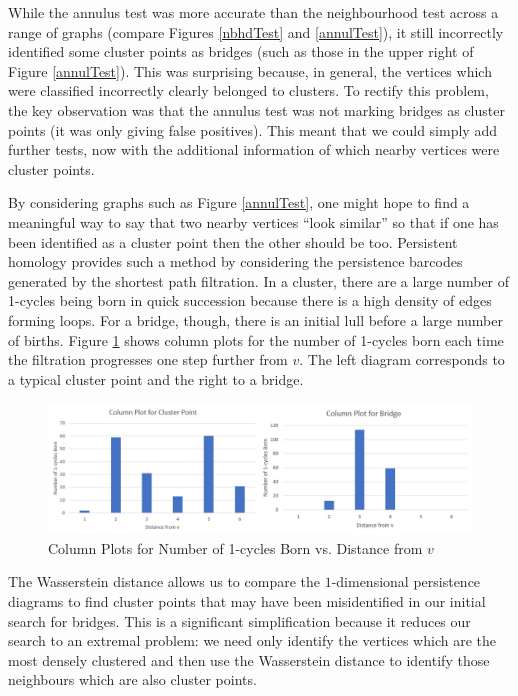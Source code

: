 \documentclass[12pt,a4paper]{amsart}
\numberwithin{equation}{section}
\theoremstyle{plain}
\theoremstyle{definition}
\begin{document}
While the annulus test was more accurate than the neighbourhood test across a range of graphs (compare Figures \ref{nbhdTest} and \ref{annulTest}), it still incorrectly identified some cluster points as bridges (such as those in the upper right of Figure \ref{annulTest}). This was surprising because, in general, the vertices which were classified incorrectly clearly belonged to clusters. To rectify this problem, the key observation was that the annulus test was not marking bridges as cluster points (it was only giving false positives). This meant that we could simply add further tests, now with the additional information of which nearby vertices were cluster points. 

By considering graphs such as Figure \ref{annulTest}, one might hope to find a meaningful way to say that two nearby vertices ``look similar'' so that if one has been identified as a cluster point then the other should be too. Persistent homology provides such a method by considering the persistence barcodes generated by the shortest path filtration. In a cluster, there are a large number of 1-cycles being born in quick succession because there is a high density of edges forming loops. For a bridge, though, there is an initial lull before a large number of births. Figure \ref{columnPlots} shows column plots for the number of 1-cycles born each time the filtration progresses one step further from $v$. The left diagram corresponds to a typical cluster point and the right to a bridge.

\begin{figure}[h]
	\centering
	\includegraphics[scale=0.65]{ColumnPlots.jpg}
	\caption{Column Plots for Number of 1-cycles Born vs. Distance from $v$}
	\label{columnPlots}
\end{figure}

\newpage

The Wasserstein distance allows us to compare the $1$-dimensional persistence diagrams to find cluster points that may have been misidentified in our initial search for bridges. This is a significant simplification because it reduces our search to an extremal problem: we need only identify the vertices which are the most densely clustered and then use the Wasserstein distance to identify those neighbours which are also cluster points. 
\end{document}

